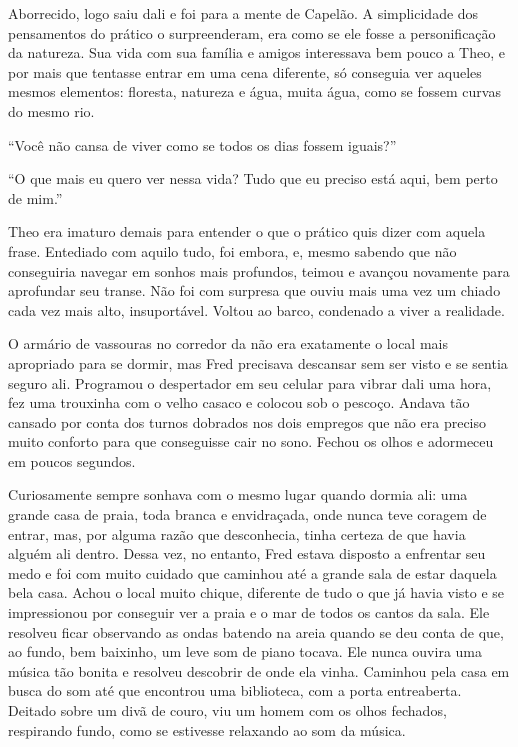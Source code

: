Aborrecido, logo saiu dali e foi para a mente de Capelão. A simplicidade
dos pensamentos do prático o surpreenderam, era como se ele fosse a
personificação da natureza. Sua vida com sua família e amigos
interessava bem pouco a Theo, e por mais que tentasse entrar em uma cena
diferente, só conseguia ver aqueles mesmos elementos: floresta, natureza
e água, muita água, como se fossem curvas do mesmo rio.

``Você não cansa de viver como se todos os dias fossem iguais?''

``O que mais eu quero ver nessa vida? Tudo que eu preciso está aqui, bem
perto de mim.''

Theo era imaturo demais para entender o que o prático quis dizer com
aquela frase. Entediado com aquilo tudo, foi embora, e, mesmo sabendo que
não conseguiria navegar em sonhos mais profundos, teimou e avançou
novamente para aprofundar seu transe. Não foi com surpresa que ouviu
mais uma vez um chiado cada vez mais alto, insuportável. Voltou ao
barco, condenado a viver a realidade.

\asterisc

O armário de vassouras no corredor da  não era exatamente o local
mais apropriado para se dormir, mas Fred precisava descansar sem ser
visto e se sentia seguro ali. Programou o despertador em seu celular
para vibrar dali uma hora, fez uma trouxinha com o velho casaco e
colocou sob o pescoço. Andava tão cansado por conta dos turnos dobrados
nos dois empregos que não era preciso muito conforto para que
conseguisse cair no sono. Fechou os olhos e adormeceu em poucos
segundos.

Curiosamente sempre sonhava com o mesmo lugar quando dormia ali: uma
grande casa de praia, toda branca e envidraçada, onde nunca teve coragem
de entrar, mas, por alguma razão que desconhecia, tinha certeza de que
havia alguém ali dentro. Dessa vez, no entanto, Fred estava disposto a
enfrentar seu medo e foi com muito cuidado que caminhou até a grande
sala de estar daquela bela casa. Achou o local muito chique, diferente
de tudo o que já havia visto e se impressionou por conseguir ver a praia
e o mar de todos os cantos da sala. Ele resolveu ficar observando as
ondas batendo na areia quando se deu conta de que, ao fundo, bem
baixinho, um leve som de piano tocava. Ele nunca ouvira uma música tão
bonita e resolveu descobrir de onde ela vinha. Caminhou pela casa em
busca do som até que encontrou uma biblioteca, com a porta entreaberta.
Deitado sobre um divã de couro, viu um homem com os olhos fechados,
respirando fundo, como se estivesse relaxando ao som da música.


